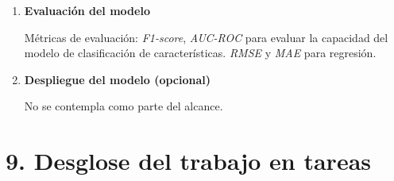 \documentclass[
11pt, %
]{charter}
\begin{document}
\begin{enumerate}
  \item \textbf{Evaluación del modelo}

  Métricas de evaluación: \textit{F1-score}, \textit{AUC-ROC} para evaluar la capacidad del modelo de clasificación de características. \textit{RMSE} y \textit{MAE} para regresión.

  \item \textbf{Despliegue del modelo (opcional)} 
  
  No se contempla como parte del alcance.
\end{enumerate}

\section{9. Desglose del trabajo en tareas}
\label{sec:wbs}


\end{document}
